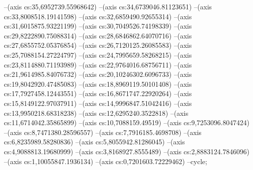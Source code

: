 --(axis cs:35,6952739.55968642)
--(axis cs:34,6739046.81123651)
--(axis cs:33,8008518.19141598)
--(axis cs:32,6859490.92655314)
--(axis cs:31,6015875.93221199)
--(axis cs:30,7049526.74198339)
--(axis cs:29,8222890.75088314)
--(axis cs:28,6846862.64070716)
--(axis cs:27,6855752.05376854)
--(axis cs:26,7120125.26085583)
--(axis cs:25,7088154.27224797)
--(axis cs:24,7995659.58268215)
--(axis cs:23,8114880.71193989)
--(axis cs:22,9764016.68756711)
--(axis cs:21,9614985.84076732)
--(axis cs:20,10246302.6096733)
--(axis cs:19,8042920.47485083)
--(axis cs:18,8969119.50101408)
--(axis cs:17,7927458.12443551)
--(axis cs:16,8671747.22920264)
--(axis cs:15,8149122.97037911)
--(axis cs:14,9996847.51042416)
--(axis cs:13,9950218.68318238)
--(axis cs:12,6295240.3522818)
--(axis cs:11,6714042.35865899)
--(axis cs:10,7088159.49519)
--(axis cs:9,7253096.8047424)
--(axis cs:8,7471380.28596557)
--(axis cs:7,7916185.4698708)
--(axis cs:6,8235989.58280836)
--(axis cs:5,8055942.81286045)
--(axis cs:4,9088813.19680999)
--(axis cs:3,8168927.8555489)
--(axis cs:2,8883124.7846096)
--(axis cs:1,10055847.1936134)
--(axis cs:0,7201603.72229462)
--cycle;

